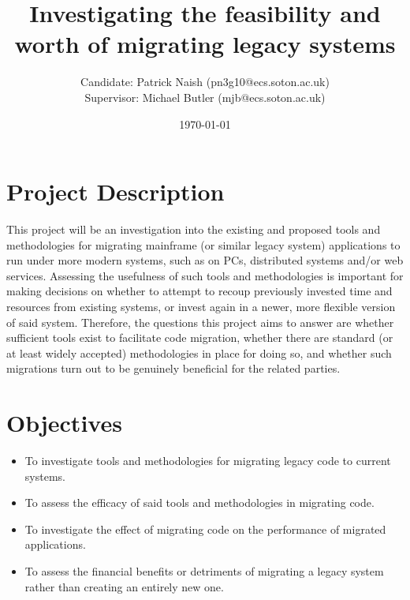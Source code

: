 \documentclass[a4paper,10pt]{article}
\title{Investigating the feasibility and worth of migrating legacy systems}
\date{\today}
\author{Candidate: Patrick Naish (pn3g10@ecs.soton.ac.uk)\\Supervisor: Michael Butler (mjb@ecs.soton.ac.uk)}
\begin{document}
\maketitle

\section{Project Description}
This project will be an investigation into the existing and proposed tools and methodologies for migrating mainframe (or similar legacy system) applications to run under more modern systems, such as on PCs, distributed systems and/or web services. Assessing the usefulness of such tools and methodologies is important for making decisions on whether to attempt to recoup previously invested time and resources from existing systems, or invest again in a newer, more flexible version of said system. Therefore, the questions this project aims to answer are whether sufficient tools exist to facilitate code migration, whether there are standard (or at least widely accepted) methodologies in place for doing so, and whether such migrations turn out to be genuinely beneficial for the related parties.

\section{Objectives}
\begin{itemize}
	\item To investigate tools and methodologies for migrating legacy code to current systems.
	\item To assess the efficacy of said tools and methodologies in migrating code.
	\item To investigate the effect of migrating code on the performance of migrated applications.
	\item To assess the financial benefits or detriments of migrating a legacy system rather than creating an entirely new one.
\end{itemize}
\end{document}
